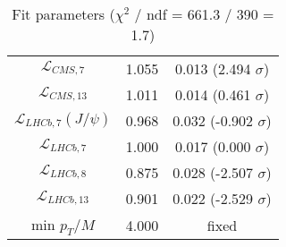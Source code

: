 \begin{table}[h!]
\begin{tabular}{c|c|c}
$\mathcal L_{CMS,7}$ & 1.055 & 0.013 (2.494 $\sigma$) \\
$\mathcal L_{CMS,13}$ & 1.011 & 0.014 (0.461 $\sigma$) \\
$\mathcal L_{LHCb,7}(J/\psi)$ & 0.968 & 0.032 (-0.902 $\sigma$) \\
$\mathcal L_{LHCb,7}$ & 1.000 & 0.017 (0.000 $\sigma$) \\
$\mathcal L_{LHCb,8}$ & 0.875 & 0.028 (-2.507 $\sigma$) \\
$\mathcal L_{LHCb,13}$ & 0.901 & 0.022 (-2.529 $\sigma$) \\
min $p_T/M$ & 4.000 & fixed \\
\end{tabular}
\caption{Fit parameters ($\chi^2$ / ndf = 661.3 / 390 = 1.7)}
\end{table}
